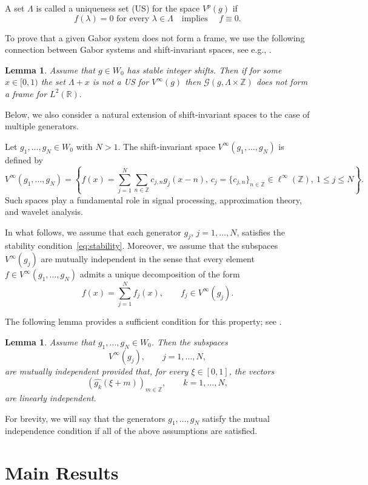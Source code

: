 \documentclass[10pt,a4paper]{amsart}
\numberwithin{equation}{section}
\newtheorem{lemma}[theorem]{Lemma}
\newcommand{\R}{{\mathbb R}} \newcommand{\Q}{{\mathbb Q}} \newcommand{\Z}{{\mathbb Z}} \newcommand{\N}{{\mathbb N}}
\begin{document}
A set $\Lambda$ is called a uniqueness set (US) for the space $V^p(g)$ if 
$$
f(\lambda) = 0 \,\, \text{for every } \lambda \in \Lambda \quad \text{implies }\quad f\equiv 0.
$$

To prove that a given Gabor system does not form a frame, we use the following connection between Gabor systems and shift-invariant spaces, see e.g., \cite{MR4047939}.

\begin{lemma}\label{lem:gabor_frames_uniquenes_sets}
    Assume that $g \in W_0$ has stable integer shifts. Then if for some $x\in[0,1)$ the set $\Lambda +x$ is not a US for $V^\infty(g)$ then $\mathcal{G}(g, \Lambda \times \Z)$ does not form a frame for $L^2(\R).$
\end{lemma}

Below, we also consider a natural extension of shift-invariant spaces to the case of multiple generators.

Let $g_1,...,g_N \in W_0$ with $ N>1.$ The shift-invariant space $V^\infty(g_1,...,g_N)$  is defined by
$$
V^\infty(g_1,\dots,g_N)
=
\left\{
 f(x)=\sum_{j=1}^N\sum_{n\in\mathbb Z} c_{j,n}g_j(x-n),
\, c_j=\{c_{j,n}\}_{n\in\mathbb Z}\in \ell^\infty(\mathbb Z),
\ 1\leq j\leq N
\right\}.
$$
Such spaces play a fundamental role in signal processing, approximation theory, and wavelet analysis.  


In what follows, we assume that each generator $g_j$, $j=1,\dots,N$, satisfies the stability condition~\eqref{eq:stability}. Moreover, we assume that the subspaces $V^{\infty}(g_j)$ are mutually independent in the sense that every element $f\in V^\infty(g_1,\dots,g_N)$ admits a unique decomposition of the form
$$
f(x)=\sum_{j=1}^N f_j(x),
\qquad
f_j\in V^\infty(g_j).
$$

The following lemma provides a sufficient condition for this property; see \cite{MR1850960}.

\begin{lemma}\label{lem:mutual_stable}
Assume that $g_1,\dots,g_N\in W_0$. Then the subspaces
$$
V^\infty(g_j), \qquad j=1,\dots,N,
$$
are mutually independent provided that, for every $\xi\in[0,1]$, the vectors
$$
\left(\widehat{g_k}(\xi+m)\right)_{m\in\Z},
\qquad k=1,\dots,N,
$$
are linearly independent.
\end{lemma}

For brevity, we will say that the generators $g_1,\dots,g_N$ satisfy the mutual independence condition if all of the above assumptions are satisfied.


\section{Main Results}
\end{document}
